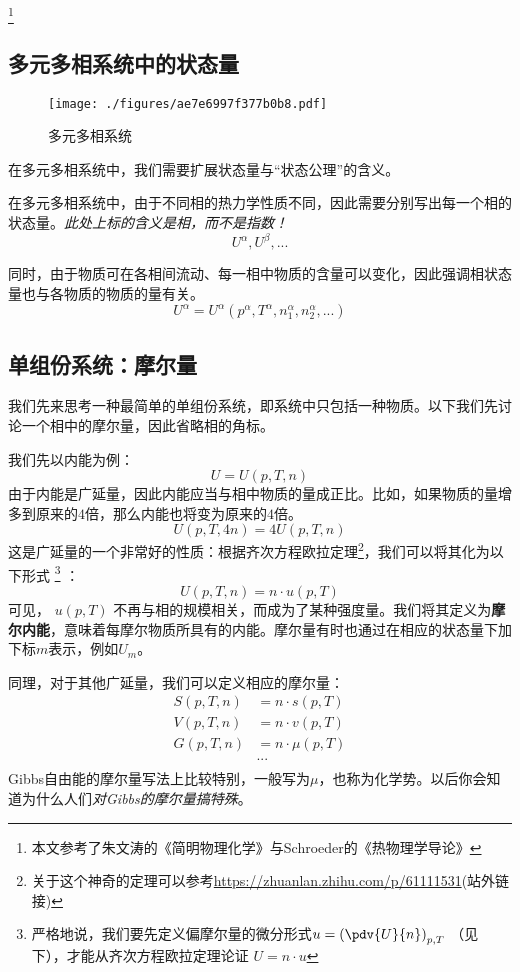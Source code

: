 
\begin{issues}
\issueDraft
\end{issues}

\footnote{本文参考了朱文涛的《简明物理化学》与Schroeder的《热物理学导论》}

\subsection{多元多相系统中的状态量}
\begin{figure}[ht]
\centering
\texttt{[image: ./figures/ae7e6997f377b0b8.pdf]}
\caption{多元多相系统} \label{fig_ParMol_1}
\end{figure}

在多元多相系统中，我们需要扩展状态量与“状态公理”的含义。

在多元多相系统中，由于不同相的热力学性质不同，因此需要分别写出每一个相的状态量。\textsl{此处上标的含义是相，而不是指数！}
$$U^\alpha, U^\beta,...$$

同时，由于物质可在各相间流动、每一相中物质的含量可以变化，因此强调相状态量也与各物质的物质的量有关。
$$U^\alpha = U^\alpha (p^\alpha, T^\alpha, n_1^\alpha,n_2^\alpha,...)$$

\subsection{单组份系统：摩尔量}
我们先来思考一种最简单的单组份系统，即系统中只包括一种物质。以下我们先讨论一个相中的摩尔量，因此省略相的角标。

我们先以内能为例：
$$U = U (p, T, n)$$
由于内能是广延量，因此内能应当与相中物质的量成正比。比如，如果物质的量增多到原来的$4$倍，那么内能也将变为原来的$4$倍。
$$U(p, T, 4 n) = 4 U (p, T, n)$$
这是广延量的一个非常好的性质：根据齐次方程欧拉定理\footnote{关于这个神奇的定理可以参考\href{https://zhuanlan.zhihu.com/p/61111531}{https://zhuanlan.zhihu.com/p/61111531}(站外链接)}，我们可以将其化为以下形式
\footnote{严格地说，我们要先定义偏摩尔量的微分形式$u = \left( \pdv{U}{n} \right)_{p,T}$ （见下），才能从齐次方程欧拉定理论证 $U = n \cdot u $}
：
$$U(p, T, n) = n \cdot u (p, T)$$
可见， $u (p, T)$ 不再与相的规模相关，而成为了某种强度量。我们将其定义为\textbf{摩尔内能}，意味着每摩尔物质所具有的内能。摩尔量有时也通过在相应的状态量下加下标$m$表示，例如$U_m$。

同理，对于其他广延量，我们可以定义相应的摩尔量：
$$
\begin{aligned}
S(p, T, n) &= n \cdot s (p, T)\\
V(p, T, n) &= n \cdot v (p, T)\\
G(p, T, n) &= n \cdot \mu (p, T)\\
&...\\
\end{aligned}
$$
Gibbs自由能的摩尔量写法上比较特别，一般写为$\mu$，也称为化学势。以后你会知道为什么人们\textsl{对Gibbs的摩尔量搞特殊}。

